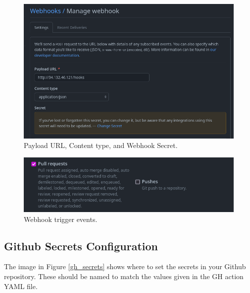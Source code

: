 {\begin{figure}[ht]
	\includegraphics[width=12cm]{images/webhook1.png}
	\caption{Payload URL, Content type, and Webhook Secret.}
	\label{wh1}
\end{figure}
\vspace{2mm}


\begin{figure}[ht]
	\includegraphics[width=12cm]{images/webhook2.png}
	\caption{Webhook trigger events.}
	\label{wh2}
\end{figure}
\vspace{2mm}

\subsection{\label{sec:gh_secrets}Github Secrets Configuration}

\justifying
The image in Figure \ref{gh_secrets} shows where to set the secrets in your Github repository. These should be named to match the values given in the GH action YAML file.
\vspace{2mm}

}
